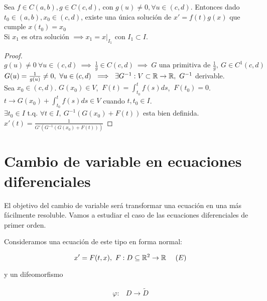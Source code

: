 \begin{nth}
Sea $f\in C(a,b), g\in C(c,d)$, con $g(u) \neq 0, \forall u \in (c,d)$. Entonces dado $t_0 \in (a,b), x_0 \in (c,d)$, existe una única solución de $x' = f(t)g(x)$ que cumple $x(t_0) = x_0$\\
Si $x_1$ es otra solución $\implies x_1 = x|_{I_1}$ con $I_1\subset I$.

\end{nth}



\begin{proof}

$g(u) \neq 0 \ \forall u \in (c,d) \ \implies \ \frac{1}{g} \in C(c,d) \ \implies \ G \text{ una primitiva de } \frac{1}{g}, \ G\in C^{1}(c,d)$\\

$G(u) = \frac{1}{g(u)} \neq 0, \ \forall u \in (c,d) \ \implies \ \exists G^{-1}:V\subset \mathbb{R} \to \mathbb{R}, \ G^{-1}$ derivable.\\

Sea $x_0 \in (c,d)$. $G(x_0) \in  V$, $\ F(t) = \int_{t_0}^t f(s) ds$, $\ F(t_0) = 0$.\\

$t \to G(x_0)+\int_{t_0}^t f(s) ds  \in V$ cuando $t,t_0 \in I$.\\

$\exists t_0 \in I$ t.q. $\forall t \in I, \ G^{-1}(G(x_0) + F(t))$ esta bien definida.\\

$x'(t) = \frac{1}{G'(G^{-1}(G(x_0) + F(t)))}$


\end{proof}

  
\section{Cambio de variable en ecuaciones diferenciales}
El objetivo del cambio de variable será transformar una ecuación en una más fácilmente resoluble.
Vamos a estudiar el caso de las ecuaciones diferenciales de primer orden.


Consideramos una ecuación de este tipo en forma normal:

\[
  x' = F(t, x),\ F : D \subseteq \mathbb{R}^2 \to \mathbb{R} \ \ \ \ (E)
  \]

  y un difeomorfismo

  \[
  \begin{array}{lll}
    \varphi : & D \to \tilde{D} \\ 
  \end{array}
  \]

